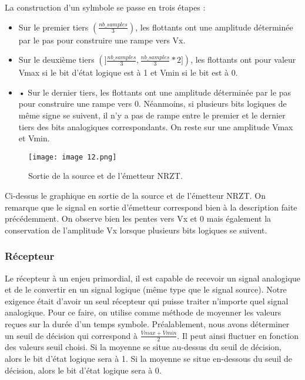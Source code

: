 La construction d'un sylmbole se passe en trois étapes :
\begin{itemize}
    \item Sur le premier tiers $ \left(\frac{nb\_samples}{3} \right) $, les flottants ont une amplitude déterminée par le pas pour construire une rampe vers Vx.
    \item Sur le deuxième tiers $(]\frac{nb\_samples}{3}, \frac{nb\_samples}{3}*2]) $, les flottants ont pour valeur Vmax si le bit d'état logique est à 1 et Vmin si le bit est à 0.
    \item •	Sur le dernier tiers, les flottants ont une amplitude déterminée par le pas pour construire une rampe vers 0. Néanmoins, si plusieurs bits logiques de même signe se suivent, il n'y a pas de rampe entre le premier et le dernier tiers des bits analogiques correspondants. On reste sur une amplitude Vmax et Vmin.
\end{itemize}

\begin{figure}[h]
    \centering
    \texttt{[image: image 12.png]}
    \caption{\label{fig:image12}Sortie de la source et de l'émetteur NRZT.}
\end{figure}

Ci-dessus le graphique en sortie de la source et de l'émetteur NRZT. On remarque que le signal en sortie d'émetteur correspond bien à la description faite précédemment. On observe bien les pentes vers Vx et 0 mais également la conservation de l'amplitude Vx lorsque plusieurs bits logiques se suivent.

\subsubsection{Récepteur}

Le récepteur à un enjeu primordial, il est capable de recevoir un signal analogique et de le convertir en un signal logique (même type que le signal source). Notre exigence était d'avoir un seul récepteur qui puisse traiter n'importe quel signal analogique.
Pour ce faire, on utilise comme méthode de moyenner les valeurs reçues sur la durée d'un temps symbole. Préalablement, nous avons déterminer un seuil de décision qui correspond à $\frac{Vmax + Vmin}{2}$.
Il peut ainsi fluctuer en fonction des valeurs seuil choisi. Si la moyenne se situe au-dessus du seuil de décision, alors le bit d'état logique sera à 1. Si la moyenne se situe en-dessous du seuil de décision, alors le bit d'état logique sera à 0.

